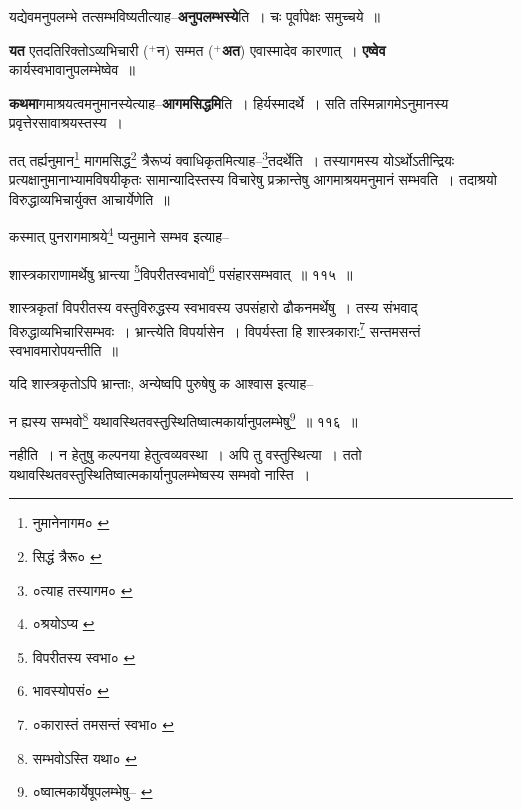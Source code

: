 \documentclass[article,12pt,a4paper]{memoir}
\newcommand{\add}[1]{($^{+}$#1)}
\begin{document}
	  \pstart यद्येवमनुपलम्भे तत्सम्भविष्यतीत्याह--\textbf{अनुपलम्भस्ये}ति । चः पूर्वापेक्षः समुच्चये ॥
	\pend
      

	  \pstart \textbf{यत} एतदतिरिक्तोऽव्यभिचारी \add{न} सम्मत \add{\textbf{अत}} एवास्मादेव कारणात् । \textbf{एष्वेव} कार्यस्वभावानुपलम्भेष्वेव ॥
	\pend
      

	  \pstart \textbf{कथमा}गमाश्रयत्वमनुमानस्येत्याह--\textbf{आगमसिद्धमि}ति । हिर्यस्मादर्थे । सति तस्मिन्नागमेऽनुमानस्य प्रवृत्तेरसावाश्रयस्तस्य ।
	\pend
      \leavevmode{}
	  \bigskip
	  \begingroup
	

	  \pstart तत् तर्ह्यनुमान\footnote{नुमानेनागम० \cite{dp-msA} \cite{dp-msB} \cite{dp-edP} \cite{dp-edH}} मागमसिद्ध\footnote{सिद्धं त्रैरू० \cite{dp-msC}} त्रैरूप्यं क्वाधिकृतमित्याह--\footnote{०त्याह तस्यागम० \cite{dp-msB}}तदर्थेति । तस्यागमस्य योऽर्थोऽतीन्द्रियः प्रत्यक्षानुमानाभ्यामविषयीकृतः सामान्यादिस्तस्य विचारेषु प्रक्रान्तेषु आगमाश्रयमनुमानं सम्भवति । तदाश्रयो विरुद्धाव्यभिचार्युक्त आचार्येणेति ॥
	\pend
       

	  \pstart कस्मात् पुनरागमाश्रये\footnote{०श्रयोऽप्य \cite{dp-msA}} प्यनुमाने सम्भव इत्याह--
	\pend
       
	  \bigskip
	  \begingroup
	

	  \pstart शास्त्रकाराणामर्थेषु भ्रान्त्या \footnote{विपरीतस्य स्वभा० \cite{dp-msB} \cite{dp-edP} \cite{dp-edH} \cite{dp-edE}}विपरीतस्वभावो\footnote{भावस्योपसं० \cite{dp-edN}} पसंहारसम्भवात् ॥ ११५ ॥
	\pend
      
	  \endgroup
	 

	  \pstart शास्त्रकृतां विपरीतस्य वस्तुविरुद्धस्य स्वभावस्य उपसंहारो ढौकनमर्थेषु । तस्य संभवाद् विरुद्धाव्यभिचारिसम्भवः । भ्रान्त्येति विपर्यासेन । विपर्यस्ता हि शास्त्रकाराः\footnote{०कारास्तं तमसन्तं स्वभा० \cite{dp-edE}} सन्तमसन्तं स्वभावमारोपयन्तीति ॥
	\pend
       

	  \pstart यदि शास्त्रकृतोऽपि भ्रान्ताः, अन्येष्वपि पुरुषेषु क आश्वास इत्याह--
	\pend
       
	  \bigskip
	  \begingroup
	

	  \pstart न ह्यस्य सम्भवो\footnote{सम्भवोऽस्ति यथा० \cite{dp-msC}} यथावस्थितवस्तुस्थितिष्वात्मकार्यानुपलम्भेषु\footnote{०ष्वात्मकार्येषूपलम्भेषु--\cite{dp-msB} \cite{dp-edP} \cite{dp-edH}} ॥ ११६ ॥
	\pend
      
	  \endgroup
	 

	  \pstart नहीति । न हेतुषु कल्पनया हेतुत्वव्यवस्था । अपि तु वस्तुस्थित्या । ततो यथावस्थितवस्तुस्थितिष्वात्मकार्यानुपलम्भेष्वस्य सम्भवो नास्ति ।
	\pend
       
\end{document}
